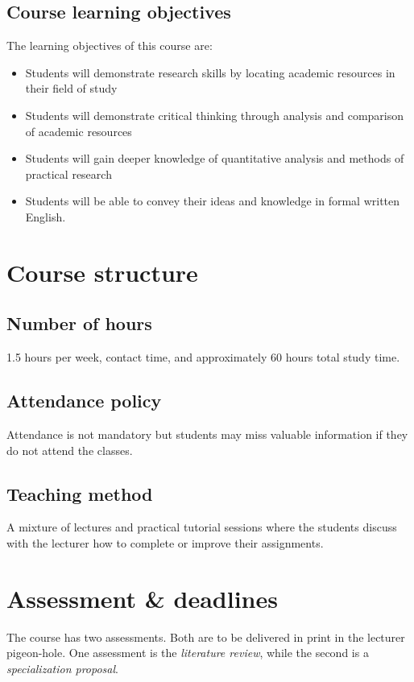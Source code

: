 \documentclass{article}
\begin{document}
\subsection{Course learning objectives}
The learning objectives of this course are:

\begin{itemize}
\item Students will demonstrate research skills by locating academic resources in their field of study
\item Students will demonstrate critical thinking through analysis and comparison of academic resources
\item Students will gain deeper knowledge of quantitative analysis and methods of practical research
\item Students will be able to convey their ideas and knowledge in formal written English.
\end{itemize}


\section{Course structure}
\subsection{Number of hours}
1.5 hours per week, contact time, and approximately 60 hours total study time.


\subsection{Attendance policy}
Attendance is not mandatory but students may miss valuable information if they do not attend the classes.


\subsection{Teaching method}
A mixture of lectures and practical tutorial sessions where the students discuss with the lecturer how to complete or improve their assignments.


\section{Assessment \& deadlines}
The course has two assessments. Both are to be delivered in print in the lecturer pigeon-hole. One assessment is the \textit{literature review}, while the second is a \textit{specialization proposal}.
\end{document}
